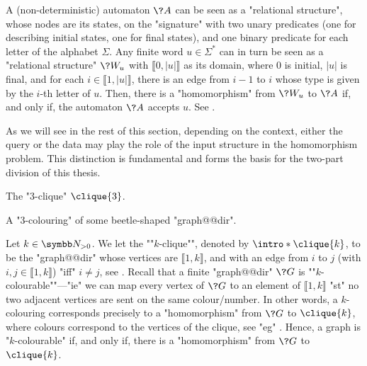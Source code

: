 \begin{example}
	\AP\label{ex:auto-as-rel}
	A (non-deterministic) automaton $\?A$ can be seen as a "relational structure",
	whose nodes are its states, on the "signature" with two unary predicates (one for
	describing initial states, one for final states), and one binary predicate
	for each letter of the alphabet $\Sigma$.
	Any finite word $u\in \Sigma^*$ can in turn be seen as a "relational structure"
	$\?W_u$ with $\lBrack 0,|u|\rBrack$ as its domain,
	where $0$ is initial, $|u|$ is final, and
	for each $i \in \lBrack 1,|u|\rBrack$, there is an edge from $i-1$ to $i$
	whose type is given by the $i$-th letter of $u$.
	Then, there is a "homomorphism" from $\?W_u$ to $\?A$ if, and only if, 
	the automaton $\?A$ accepts $u$. See .
\end{example}

As we will see in the rest of this section,
depending on the context, either the query or the data may play the role of the input structure in the homomorphism problem. This distinction is fundamental and forms the basis for the two-part division of this thesis.

\begin{marginfigure}
	\centering
	\begin{tikzpicture}
		
	\end{tikzpicture}
	\caption{
		\AP\label{fig:intro-3-clique}
		The "$3$-clique" $\clique{3}$.
	}
\end{marginfigure}
\begin{marginfigure}
	\centering
	\begin{tikzpicture}
		
	\end{tikzpicture}
	\caption{
		\AP\label{fig:dichotomy-ex-3-clique}
		A "$3$-colouring" of some beetle-shaped "graph@@dir".
	}
\end{marginfigure}
\begin{example}
	\AP\label{ex:graph-colouring-as-hom}
	Let $k\in\Np$. We let the \AP""$k$-clique"", denoted by $\intro*\clique{k}$,
	to be the "graph@@dir" whose vertices are $\lBrack 1,k\rBrack$,
	and with an edge from $i$ to $j$ (with $i,j \in \lBrack 1,k\rBrack$)
	"iff" $i\neq j$, see .
	Recall that a finite "graph@@dir" $\?G$ is \AP""$k$-colourable""---"ie"
	we can map every vertex of $\?G$ to an element of $\lBrack 1,k\rBrack$
	"st" no two adjacent vertices are sent on the same colour/number.
	In other words, a $k$-colouring corresponds precisely to a "homomorphism" from $\?G$
	to $\clique{k}$, where colours correspond to the vertices of the clique,
	see "eg" .
	Hence, a graph is "$k$-colourable" if, and only if,
	there is a "homomorphism" from $\?G$ to $\clique{k}$.
\end{example}

